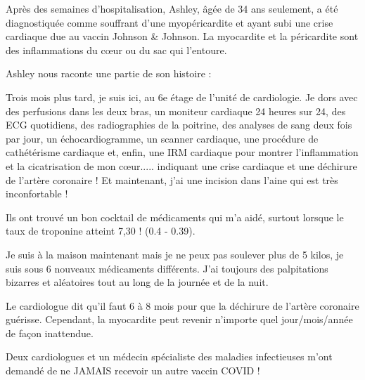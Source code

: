 Après des semaines d'hospitalisation, Ashley, âgée de 34 ans seulement, a été
diagnostiquée comme souffrant d'une myopéricardite et ayant subi une crise
cardiaque due au vaccin Johnson \& Johnson. La myocardite et la péricardite sont
des inflammations du cœur ou du sac qui l'entoure.

Ashley nous raconte une partie de son histoire :

Trois mois plus tard, je suis ici, au 6e étage de l'unité de cardiologie. Je
dors avec des perfusions dans les deux bras, un moniteur cardiaque 24 heures sur
24, des ECG quotidiens, des radiographies de la poitrine, des analyses de sang
deux fois par jour, un échocardiogramme, un scanner cardiaque, une procédure de
cathétérisme cardiaque et, enfin, une IRM cardiaque pour montrer l'inflammation
et la cicatrisation de mon cœur..... indiquant une crise cardiaque et une
déchirure de l'artère coronaire ! Et maintenant, j'ai une incision dans l'aine
qui est très inconfortable !

Ils ont trouvé un bon cocktail de médicaments qui m'a aidé, surtout lorsque le
taux de troponine atteint 7,30 ! (0.4 - 0.39).

Je suis à la maison maintenant mais je ne peux pas soulever plus de 5 kilos, je
suis sous 6 nouveaux médicaments différents. J'ai toujours des palpitations
bizarres et aléatoires tout au long de la journée et de la nuit.

Le cardiologue dit qu'il faut 6 à 8 mois pour que la déchirure de l'artère
coronaire guérisse. Cependant, la myocardite peut revenir n'importe quel
jour/mois/année de façon inattendue.

Deux cardiologues et un médecin spécialiste des maladies infectieuses m'ont
demandé de ne JAMAIS recevoir un autre vaccin COVID !
